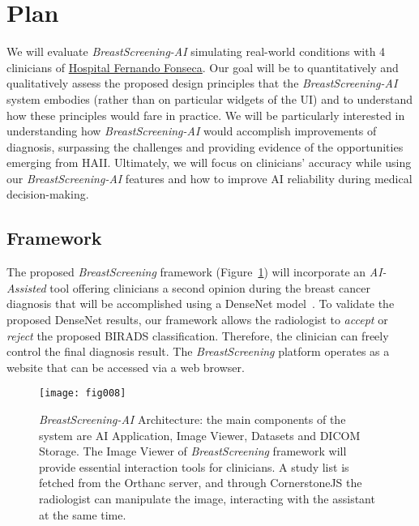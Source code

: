 \section{Plan}
\label{sec:sec004}

We will evaluate {\it BreastScreening-AI} simulating real-world conditions with 4 clinicians of \hyperlink{https://hff.min-saude.pt/}{Hospital Fernando Fonseca}.
Our goal will be to quantitatively and qualitatively assess the proposed design principles that the {\it BreastScreening-AI} system embodies (rather than on particular widgets of the UI) and to understand how these principles would fare in practice.
We will be particularly interested in understanding how {\it BreastScreening-AI} would accomplish improvements of diagnosis, surpassing the challenges and providing evidence of the opportunities emerging from HAII.
Ultimately, we will focus on clinicians' accuracy while using our {\it BreastScreening-AI} features and how to improve AI reliability during medical decision-making.

\subsection{Framework}
\label{sec:sec00401}

The proposed {\it BreastScreening} framework (Figure~\ref{fig:fig008}) will incorporate an {\it AI-Assisted} tool offering clinicians a second opinion during the breast cancer diagnosis that will be accomplished using a DenseNet model~\cite{chen2019learning}.
To validate the proposed DenseNet results, our framework allows the radiologist to {\it accept} or {\it reject} the proposed BIRADS classification.
Therefore, the clinician can freely control the final diagnosis result.
The {\it BreastScreening} platform operates as a website that can be accessed via a web browser.


\begin{figure}[h]
\centering
\texttt{[image: fig008]}
\caption{{\it BreastScreening-AI} Architecture: the main components of the system are AI Application, Image Viewer, Datasets and DICOM Storage. The Image Viewer of {\it BreastScreening} framework will provide essential interaction tools for clinicians. A study list is fetched from the Orthanc server, and through CornerstoneJS the radiologist can manipulate the image, interacting with the assistant at the same time.}
\label{fig:fig008}
\end{figure}

